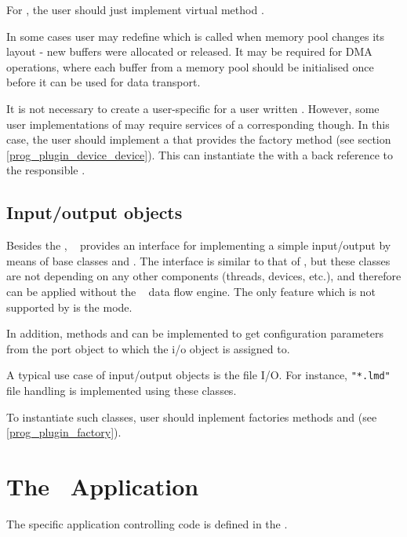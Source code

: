 For , the user should just 
implement virtual method  .  

In some cases user may redefine  which is called when
memory pool changes its layout - new buffers were allocated or released. 
It may be required for DMA operations, where each buffer from a memory pool
should be initialised once before it can be used for data transport.   

It is not necessary to create a user-specific  
for a user written . 
However, some user implementations of  may require
services of a corresponding  though. In this
case, the user should implement a  that
provides the factory method  (see section \ref{prog_plugin_device_device}). 
This can instantiate the  with a back reference to the responsible . 



\subsection{Input/output objects}
Besides the ,
\dabc~ provides an interface for implementing
a simple input/output by means of base classes
 and .
The interface is similar to that of ,
but these classes are not depending on 
any other components (threads, devices, etc.), 
and therefore can be applied without the  \dabc~ data flow engine.
The only feature which is not supported by  is the  
mode.

In addition, methods  and
 can be implemented to get 
configuration parameters from the port object to which the i/o object is assigned to.  

A typical use case of input/output objects is the file I/O. 
For instance, {\tt "*.lmd"} file handling is implemented
using these classes.

To instantiate such classes, user should inplement factories methods 
 and  (see \ref{prog_plugin_factory}).


\section[The DABC application]{The \dabc\ Application}
\label{prog_plugin_applicaton}
The specific application controlling code is defined in the .

